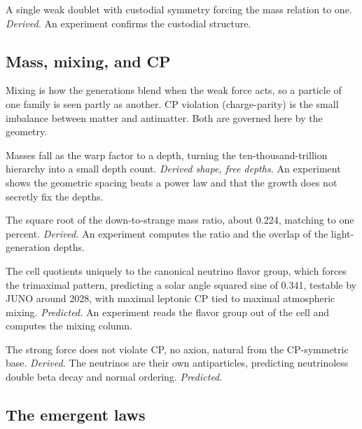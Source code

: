 \begin{finding}
A single weak doublet with custodial symmetry forcing the mass relation to one. \emph{Derived.} An experiment confirms the custodial structure.
\end{finding}

\subsection*{Mass, mixing, and CP}

Mixing is how the generations blend when the weak force acts, so a particle of one family is seen partly as another. CP violation (charge-parity) is the small imbalance between matter and antimatter. Both are governed here by the geometry.

\begin{finding}
Masses fall as the warp factor to a depth, turning the ten-thousand-trillion hierarchy into a small depth count. \emph{Derived shape, free depths.} An experiment shows the geometric spacing beats a power law and that the growth does not secretly fix the depths.
\end{finding}

\begin{finding}
The square root of the down-to-strange mass ratio, about 0.224, matching to one percent. \emph{Derived.} An experiment computes the ratio and the overlap of the light-generation depths.
\end{finding}

\begin{finding}
The cell quotients uniquely to the canonical neutrino flavor group, which forces the trimaximal pattern, predicting a solar angle squared sine of 0.341, testable by JUNO around 2028, with maximal leptonic CP tied to maximal atmospheric mixing. \emph{Predicted.} An experiment reads the flavor group out of the cell and computes the mixing column.
\end{finding}

\begin{finding}
The strong force does not violate CP, no axion, natural from the CP-symmetric base. \emph{Derived.} The neutrinos are their own antiparticles, predicting neutrinoless double beta decay and normal ordering. \emph{Predicted.}
\end{finding}

\subsection*{The emergent laws}

